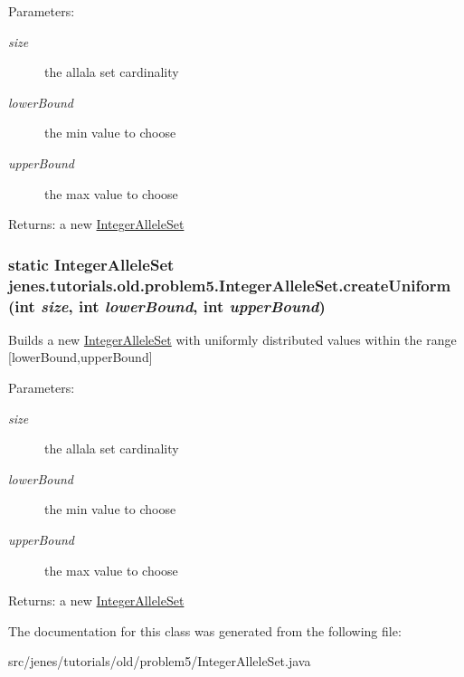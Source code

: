 \begin{Desc}
\item[Parameters:]
\begin{description}
\item[{\em size}]the allala set cardinality \item[{\em lowerBound}]the min value to choose \item[{\em upperBound}]the max value to choose \end{description}
\end{Desc}
\begin{Desc}
\item[Returns:]a new \hyperlink{classjenes_1_1tutorials_1_1old_1_1problem5_1_1_integer_allele_set}{IntegerAlleleSet} \end{Desc}
\hypertarget{classjenes_1_1tutorials_1_1old_1_1problem5_1_1_integer_allele_set_f952e89dffc31630da0371be73bae906}{
\subsubsection[createUniform]{\setlength{\rightskip}{0pt plus 5cm}static {\bf IntegerAlleleSet} jenes.tutorials.old.problem5.IntegerAlleleSet.createUniform (int {\em size}, \/  int {\em lowerBound}, \/  int {\em upperBound})}}
\label{classjenes_1_1tutorials_1_1old_1_1problem5_1_1_integer_allele_set_f952e89dffc31630da0371be73bae906}


Builds a new \hyperlink{classjenes_1_1tutorials_1_1old_1_1problem5_1_1_integer_allele_set}{IntegerAlleleSet} with uniformly distributed values within the range \mbox{[}lowerBound,upperBound\mbox{]} 

\begin{Desc}
\item[Parameters:]
\begin{description}
\item[{\em size}]the allala set cardinality \item[{\em lowerBound}]the min value to choose \item[{\em upperBound}]the max value to choose \end{description}
\end{Desc}
\begin{Desc}
\item[Returns:]a new \hyperlink{classjenes_1_1tutorials_1_1old_1_1problem5_1_1_integer_allele_set}{IntegerAlleleSet} \end{Desc}


The documentation for this class was generated from the following file:\begin{CompactItemize}
\item 
src/jenes/tutorials/old/problem5/IntegerAlleleSet.java\end{CompactItemize}

